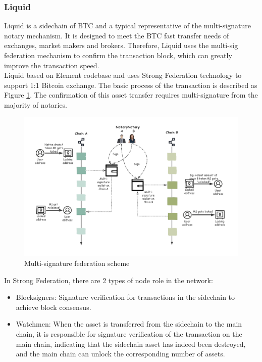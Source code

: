 \subsubsection{Liquid}
\noindent Liquid\cite{Liquid} is a sidechain of BTC and a typical representative of the multi-signature notary mechanism. It is designed to meet the BTC fast transfer needs of exchanges, market makers and brokers. Therefore, Liquid uses the multi-sig federation mechanism to confirm the transaction block, which can greatly improve the transaction speed.\\
\noindent Liquid based on Element codebase and uses Strong Federation technology to support 1:1 Bitcoin exchange. The basic process of the transaction is described as Figure \ref{fig:multisig}. The confirmation of this asset transfer requires multi-signature from the majority of notaries.

        \begin{figure}[H]
        \includegraphics[width=1\textwidth]{./figures/multi_sig.png}
        \centering
        \caption{Multi-signature federation scheme}%
        \centering
        \label{fig:multisig}
        \end{figure}
        
\noindent In Strong Federation, there are 2 types of node role in the network:
\begin{itemize}
    \item Blocksigners: Signature verification for transactions in the sidechain to achieve block consensus. 
    \item Watchmen: When the asset is transferred from the sidechain to the main chain, it is responsible for signature verification of the transaction on the main chain, indicating that the sidechain asset has indeed been destroyed, and the main chain can unlock the corresponding number of assets.
\end{itemize}

